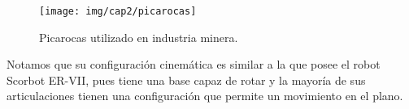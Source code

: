 \begin{figure}[ht]
  \centering
  \texttt{[image: img/cap2/picarocas]}
  \caption{Picarocas utilizado en industria minera.}
  \label{cap2_picarocas}
\end{figure}

Notamos que su configuración cinemática es similar a la que posee el robot Scorbot ER-VII, pues tiene una base capaz de rotar y la mayoría de sus articulaciones tienen una configuración que permite un movimiento en el plano.
